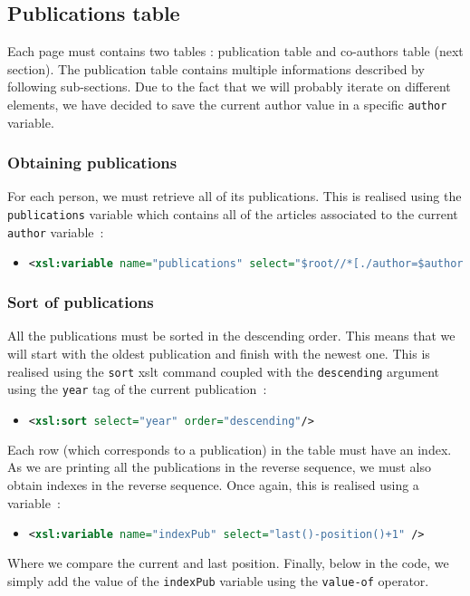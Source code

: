 \documentclass{article}
\begin{document}
  \subsection{Publications table}
  Each page must contains two tables : publication table and co-authors table (next section). The publication table contains multiple informations described by following sub-sections. Due to the fact that we will probably iterate on different elements, we have decided to save the current author value in a specific \verb|author| variable.
    \subsubsection{Obtaining publications}
      For each person, we must retrieve all of its publications. This is realised using the \verb|publications| variable which contains all of the articles associated to the current \verb|author| variable~:
 \begin{itemize}
	\item \begin{lstlisting}[language=XML]
<xsl:variable name="publications" select="$root//*[./author=$author]" />\end{lstlisting}
      \end{itemize}
      
    \subsubsection{Sort of publications}
      All the publications must be sorted in the descending order. This means that we will start with the oldest publication and finish with the newest one. This is realised using the \verb|sort| xslt command coupled with the \verb|descending| argument using the \verb|year| tag of the current publication~:
      \begin{itemize}
	\item \begin{lstlisting}[language=XML]
<xsl:sort select="year" order="descending"/>\end{lstlisting}
      \end{itemize}
      Each row (which corresponds to a publication) in the table must have an index. As we are printing all the publications in the reverse sequence, we must also obtain indexes in the reverse sequence. Once again, this is realised using a variable~:
      \begin{itemize}
	\item \begin{lstlisting}[language=XML]
<xsl:variable name="indexPub" select="last()-position()+1" />\end{lstlisting}
      \end{itemize}
      Where we compare the current and last position. Finally, below in the code, we simply add the value of the \verb|indexPub| variable using the \verb|value-of| operator. 
      
\end{document}
